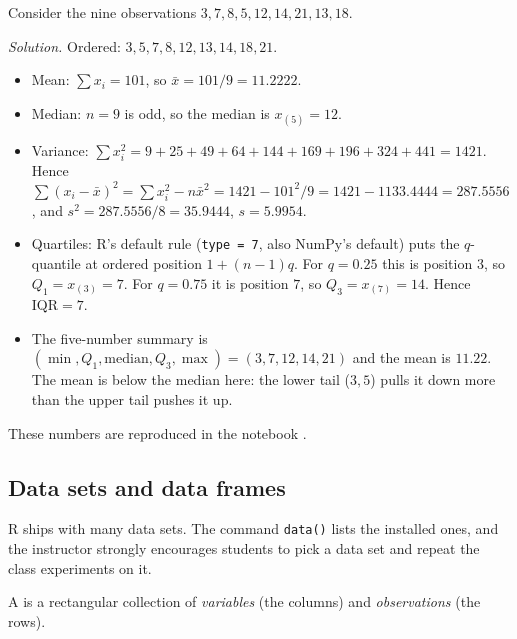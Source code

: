 \begin{example}\label{ex:L01-summary}
Consider the nine observations $3,7,8,5,12,14,21,13,18$.
\end{example}
\noindent\emph{Solution.} Ordered: $3,5,7,8,12,13,14,18,21$.
\begin{itemize}
  \item Mean: $\sum x_i=101$, so $\bar x=101/9=11.2222$.
  \item Median: $n=9$ is odd, so the median is $x_{(5)}=12$.
  \item Variance: $\sum x_i^2 = 9+25+49+64+144+169+196+324+441=1421$. Hence
  $\sum (x_i-\bar x)^2=\sum x_i^2-n\bar x^2 = 1421-101^2/9 = 1421-1133.4444=287.5556$, and
  $s^2=287.5556/8=35.9444$, $s=5.9954$.
  \item Quartiles: R's default rule (\texttt{type = 7}, also NumPy's default) puts the $q$-quantile at
  ordered position $1+(n-1)q$. For $q=0.25$ this is position $3$, so $Q_1=x_{(3)}=7$. For $q=0.75$ it is
  position $7$, so $Q_3=x_{(7)}=14$. Hence $\mathrm{IQR}=7$.
  \item The five-number summary is $(\min,Q_1,\text{median},Q_3,\max)=(3,7,12,14,21)$ and the mean is $11.22$.
  The mean is below the median here: the lower tail ($3,5$) pulls it down more than the upper tail pushes it up.
\end{itemize}
These numbers are reproduced in the notebook .

\subsection{Data sets and data frames}
R ships with many data sets. The command \texttt{data()} lists the installed ones, and the
instructor strongly encourages students to pick a data set and repeat the class experiments on it.

\begin{definition}\label{def:L01-dataframe}
A  is a rectangular collection of \emph{variables} (the columns) and
\emph{observations} (the rows).
\end{definition}

